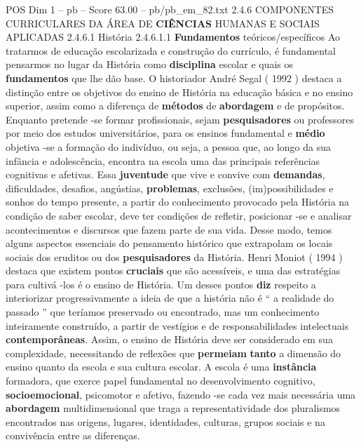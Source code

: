 \begin{textsample}{POS Dim 1 – pb – Score 63.00 – pb/pb\_em\_82.txt}  \label{ex:f1_pos_142}
2.4.6 COMPONENTES CURRICULARES DA ÁREA DE \textbf{CIÊNCIAS} HUMANAS E SOCIAIS APLICADAS 2.4.6.1 História 2.4.6.1.1 \textbf{Fundamentos} teóricos/específicos Ao tratarmos de educação escolarizada e construção do currículo, é fundamental pensarmos no lugar da História como \textbf{disciplina} escolar e quais os \textbf{fundamentos} que lhe dão base.
O historiador André Segal ( 1992 ) destaca a distinção entre os objetivos do ensino de História na educação básica e no ensino superior, assim como a diferença de \textbf{métodos} de \textbf{abordagem} e de propósitos.
Enquanto pretende -se formar profissionais, sejam \textbf{pesquisadores} ou professores por meio dos estudos universitários, para os ensinos fundamental e \textbf{médio} objetiva -se a formação do indivíduo, ou seja, a pessoa que, ao longo da sua infância e adolescência, encontra na escola uma das principais referências cognitivas e afetivas.
Essa \textbf{juventude} que vive e convive com \textbf{demandas}, dificuldades, desafios, angústias, \textbf{problemas}, exclusões, (im)possibilidades e sonhos do tempo presente, a partir do conhecimento provocado pela História na condição de saber escolar, deve ter condições de refletir, posicionar -se e analisar acontecimentos e discursos que fazem parte de sua vida.
Desse modo, temos alguns aspectos essenciais do pensamento histórico que extrapolam os locais sociais dos eruditos ou dos \textbf{pesquisadores} da História.
Henri Moniot ( 1994 ) destaca que existem pontos \textbf{cruciais} que são acessíveis, e uma das estratégias para cultivá -los é o ensino de História.
Um desses pontos \textbf{diz} respeito a interiorizar progressivamente a ideia de que a história não é “ a realidade do passado ” que teríamos preservado ou encontrado, mas um conhecimento inteiramente construído, a partir de vestígios e de responsabilidades intelectuais \textbf{contemporâneas}.
Assim, o ensino de História deve ser considerado em sua complexidade, necessitando de reflexões que \textbf{permeiam} \textbf{tanto} a dimensão do ensino quanto da escola e sua cultura escolar.
A escola é uma \textbf{instância} formadora, que exerce papel fundamental no desenvolvimento cognitivo, \textbf{socioemocional}, psicomotor e afetivo, fazendo -se cada vez mais necessária uma \textbf{abordagem} multidimensional que traga a representatividade dos pluralismos encontrados nas origens, lugares, identidades, culturas, grupos sociais e na convivência entre as diferenças.

\end{textsample}

